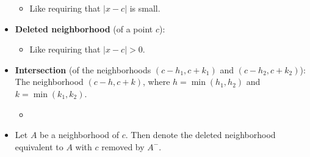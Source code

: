 \documentclass[../main.tex]{subfiles}
\begin{document}
\begin{itemize}
    \begin{itemize}
        \item Like requiring that $|x-c|$ is small.
    \end{itemize}
    \item \textbf{Deleted neighborhood} (of a point $c$): 
    \begin{itemize}
        \item Like requiring that $|x-c|>0$.
    \end{itemize}
    \item \textbf{Intersection} (of the neighborhoods $(c-h_1,c+k_1)$ and $(c-h_2,c+k_2)$): The neighborhood $(c-h,c+k)$, where $h=\min(h_1,h_2)$ and $k=\min(k_1,k_2)$.
    \begin{itemize}
        \item {}
    \end{itemize}
    \item Let $A$ be a neighborhood of $c$. Then denote the deleted neighborhood equivalent to $A$ with $c$ removed by $A^-$.
\end{itemize}
\end{document}
